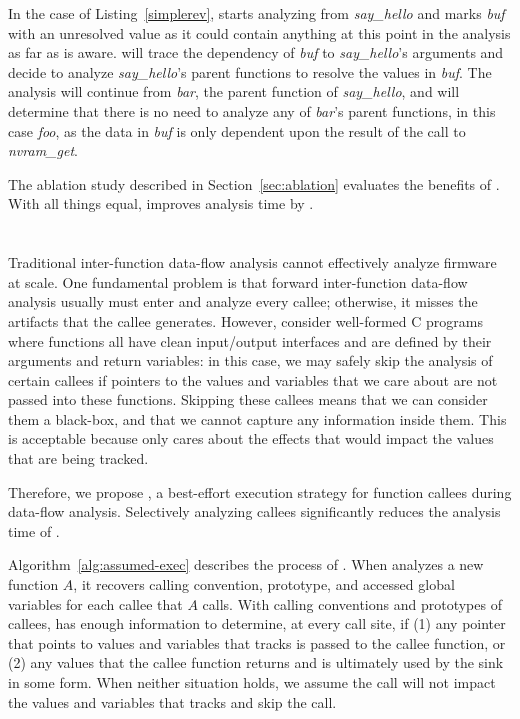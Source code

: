 In the case of Listing~\ref{simplerev}, \rda starts analyzing from \textit{say\_hello} and marks \textit{buf} with an unresolved value as it could contain anything at this point in the analysis as far as \rda is aware.
\rda will trace the dependency of \textit{buf} to \textit{say\_hello}'s arguments and decide to analyze \textit{say\_hello}'s parent functions to resolve the values in \textit{buf}.
The analysis will continue from \textit{bar}, the parent function of \textit{say\_hello}, and \rda will determine that there is no need to analyze any of \textit{bar}'s parent functions, in this case \textit{foo}, as the data in \textit{buf} is only dependent upon the result of the call to \textit{nvram\_get}.

The ablation study described in Section~\ref{sec:ablation} evaluates the benefits of \rev.
With all things equal, \rev improves analysis time by \tracePercentage.


\section{\assumed}
\label{sec:assumed_execution}

Traditional inter-function data-flow analysis cannot effectively analyze firmware at scale.
One fundamental problem is that forward inter-function data-flow analysis usually must enter and analyze every callee; otherwise, it misses the artifacts that the callee generates.
However, consider well-formed C programs where functions all have clean input/output interfaces and are defined by their arguments and return variables: in this case, we may safely skip the analysis of certain callees if pointers to the values and variables that we care about are not passed into these functions.
Skipping these callees means that we can consider them a black-box, and that we cannot capture any information inside them.
This is acceptable because \rda only cares about the effects that would impact the values that are being tracked.

Therefore, we propose \emph{\assumed}, a best-effort execution strategy for function callees during data-flow analysis.
Selectively analyzing callees significantly reduces the analysis time of \rda.



Algorithm~\ref{alg:assumed-exec} describes the process of \assumed.
When \rda analyzes a new function $A$, it recovers calling convention, prototype, and accessed global variables for each callee that $A$ calls.
With calling conventions and prototypes of callees, \rda has enough information to determine, at every call site, if (1) any pointer that points to values and variables that \rda tracks is passed to the callee function, or (2) any values that the callee function returns and is ultimately used by the sink in some form.
When neither situation holds, we assume the call will not impact the values and variables that \rda tracks and skip the call.

